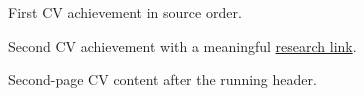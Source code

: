 \documentclass[medium=print]{careerdossier-cv}
\begin{document}
\MakeCDossierHeader
{}
\begin{CDossierEntry}[
  title={Researcher},
  organization={Example University},
  location={Toronto},
  dates={2023--2026}
]
\begin{CDossierItemize}
  \item First CV achievement in source order.
  \item Second CV achievement with a meaningful
        \href{https://example.test/research}{research link}.
\end{CDossierItemize}
\end{CDossierEntry}
\newpage
{}
\begin{CDossierEntry}[
  title={Instructor},
  organization={Example University},
  dates={2025}
]
\begin{CDossierItemize}
  \item Second-page CV content after the running header.
\end{CDossierItemize}
\end{CDossierEntry}
\end{document}
